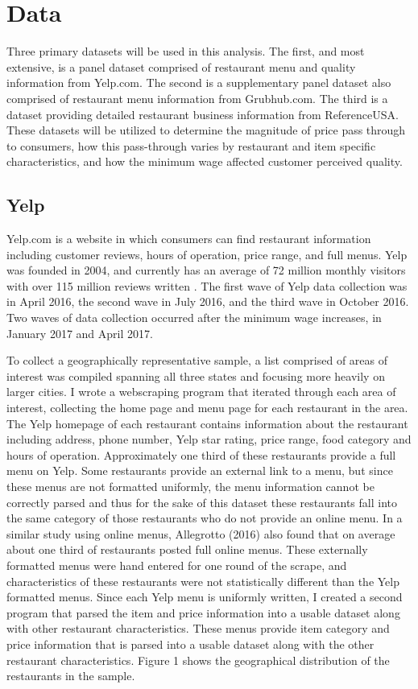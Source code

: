 \documentclass[11pt]{article}
\begin{document}
\section{Data}

Three primary datasets will be used in this analysis. The first, and most extensive,  is a panel dataset comprised of restaurant menu  and quality information from Yelp.com. The second is a supplementary panel dataset also comprised of restaurant menu information from Grubhub.com.  The third is a dataset providing detailed restaurant business information from ReferenceUSA. These datasets will be utilized to determine the magnitude of price pass through to consumers, how this pass-through varies by restaurant and item specific characteristics, and how the minimum wage affected customer perceived quality.

\subsection{Yelp}

Yelp.com is a website in which consumers can find restaurant information including customer reviews, hours of operation, price range, and full menus. Yelp was founded in 2004, and currently has an average of 72 million monthly visitors with over 115 million reviews written \cite{yelpstat}. The first wave of Yelp data collection was in April 2016, the second wave in July 2016, and the third wave in October 2016. Two waves of data collection occurred after the minimum wage increases, in January 2017 and April 2017.

To collect a geographically representative sample, a list comprised of areas of interest was compiled spanning all three states and focusing more heavily on larger cities. I wrote a webscraping program that iterated through each area of interest, collecting the home page and menu page for each restaurant in the area. The Yelp homepage of each restaurant contains information about the restaurant including address, phone number, Yelp star rating, price range, food category and hours of operation. Approximately one third of these restaurants provide a full menu on Yelp. Some restaurants provide an external link to a menu, but since these menus are not formatted uniformly, the menu information cannot be correctly parsed and thus for the sake of this dataset these restaurants fall into the same category of those restaurants who do not provide an online menu. In a similar study using online menus, Allegrotto (2016) also found that on average about one third of restaurants posted full online menus\nocite{allegretto2016local}. These externally formatted menus were hand entered for one round of the scrape, and characteristics of these restaurants were not statistically different than the Yelp formatted menus. Since each Yelp menu is uniformly written, I created a second program that parsed the item and price information into a usable dataset along with other restaurant characteristics. These menus provide item category and price information that is parsed into a usable dataset along with the other restaurant characteristics. Figure 1 shows the geographical distribution of the restaurants in the sample.
\end{document}
